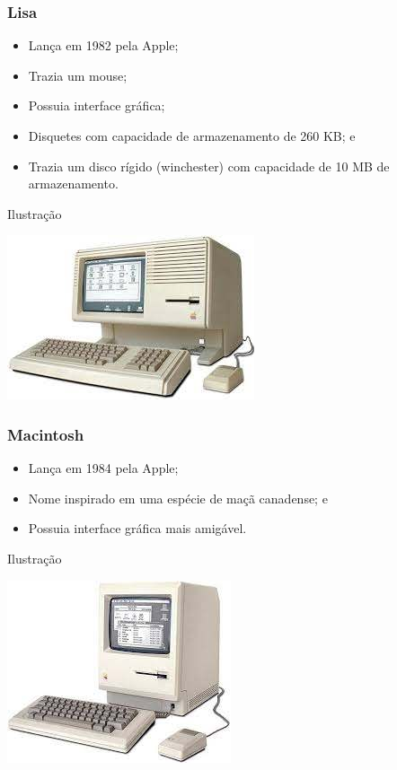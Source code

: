 \documentclass[aspectratio=169]{beamer} %
\begin{document}
\begin{frame}
	\frametitle{Lisa}
	
	\begin{itemize}
		\item Lança em 1982 pela Apple;
		\item Trazia um mouse;
		\item Possuia interface gráfica;
		\item Disquetes com capacidade de armazenamento de 260 KB; e 
		\item Trazia um disco rígido (winchester) com capacidade de 10 MB de armazenamento.
	\end{itemize}\vfill
	
	\begin{exampleblock}{Ilustra\c cão}
		\begin{center}
			\includegraphics[scale=0.4]{img/lisa}
		\end{center}			
	\end{exampleblock}
\end{frame}

\begin{frame}
	\frametitle{Macintosh}
	
	\begin{itemize}
		\item Lança em 1984 pela Apple;
		\item  Nome inspirado em uma espécie de maçã canadense; e
		\item Possuia interface gráfica mais amigável.
	\end{itemize}\vfill
	
	\begin{exampleblock}{Ilustra\c cão}
		\begin{center}
			\includegraphics[scale=0.4]{img/macintosh}
		\end{center}			
	\end{exampleblock}
\end{frame}
\end{document}
